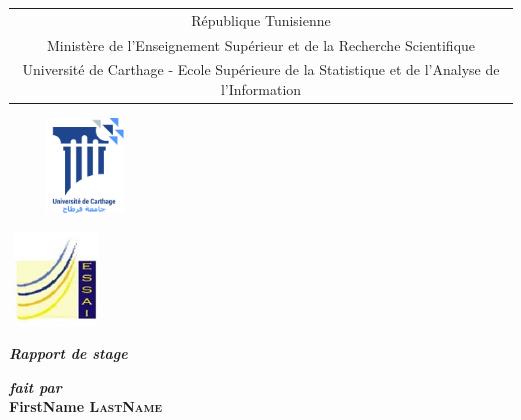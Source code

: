 \documentclass{article}
\title{\reportSubject}
\author{\reportAuthor}
\newcommand{\reportTitle} {%
  \textsc{Projet de Fin d'\'etudes}
}
\newcommand{\reportAuthor} {%
  FirstName \textsc{LastName}%
}
\newcommand{\ESSAI} {%
  Ecole Sup\'erieure de la Statistique et de l'Analyse de l'Information
}
\begin{document}
\thispagestyle{empty}
\begin{titlepage}
\begin{center}



{%
  \fontsize{9pt}{9pt}\selectfont%
  \begin{tabular}{c}
    R\'epublique Tunisienne \\
    Minist\`ere de l'Enseignement Supérieur et de la Recherche Scientifique \\%
    Universit\'e de Carthage - \ESSAI{}  \\
  \end{tabular}
}

\vspace{1cm}

\includegraphics[width=4cm, height=2.5cm]{universite-carthage.jpg}

\includegraphics[width=2.5cm, height=2.5cm]{logo-essai.jpg}\\


\vspace{30pt} {%
  \renewcommand*{\familydefault}{\defaultFont}
  \fontsize{46pt}{46pt}\selectfont%
}

\vspace{10pt}
\textbf{\textit{Rapport de stage}}


\vspace{30pt}
\textbf{\textit{fait par}}\\
\vspace{10pt} {%
  \fontsize{18pt}{18pt}\selectfont%
  \textbf{\reportAuthor}\\
}%


\end{center}
\end{titlepage}
\end{document}
